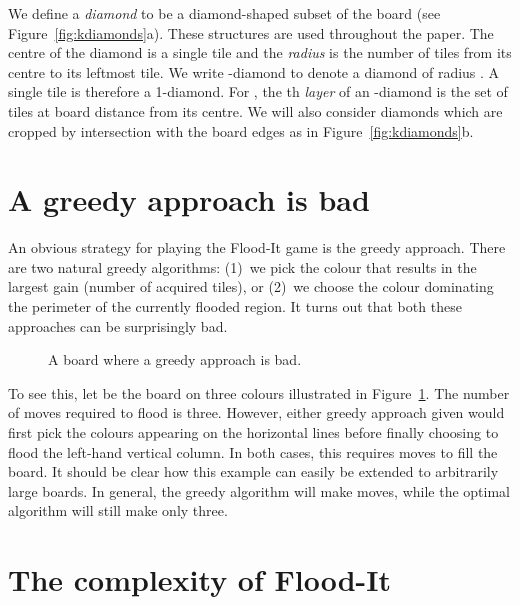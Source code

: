 \documentclass[a4paper,11pt]{llncs}
\newcommand{\pgfgraphic}[1]{}
\newcounter{l}
\newcommand{\recdim}[2]{}
\begin{document}
We define a \emph{diamond} to be a diamond-shaped subset of the board (see Figure~\ref{fig:kdiamonds}a). These structures are used throughout the paper. The centre of the diamond is a single tile and the \emph{radius}  is the number of tiles from its centre to its leftmost tile. We write -diamond to denote a diamond of radius . A single tile is therefore a 1-diamond. For , the th \emph{layer} of an -diamond is the set of tiles at board distance  from its centre. We will also consider diamonds which are cropped by intersection with the board edges as in Figure~\ref{fig:kdiamonds}b.






\section{A greedy approach is bad} \label{sec:greed}
An obvious strategy for playing the Flood-It game is the greedy approach. There are two natural greedy algorithms: (1)~we pick the colour that results in the largest gain (number of acquired tiles), or (2)~we choose the colour dominating the perimeter of the currently flooded region. It turns out that both these approaches can be surprisingly bad.

\begin{figure}[t] \centering
        \centering
        \pgfgraphic{graphic-greed}
        \caption{A \recdim{10}{10} board where a greedy approach is bad.\label{fig:greedy}}
\end{figure}

To see this, let  be the \recdim{10}{10} board on three colours illustrated in Figure~\ref{fig:greedy}.   The number of moves required to flood  is three.  However, either greedy approach given would first pick the colours appearing on the horizontal lines before finally choosing to flood the left-hand vertical column. In both cases, this requires  moves to fill the board.   It should be clear how this example can easily be extended to arbitrarily large \recdim{n}{n} boards. In general, the greedy algorithm will make  moves, while the optimal algorithm will still make only three.


\section{The complexity of Flood-It} \label{sec:NPC}
\newcommand{\stl}{w}
\end{document}
